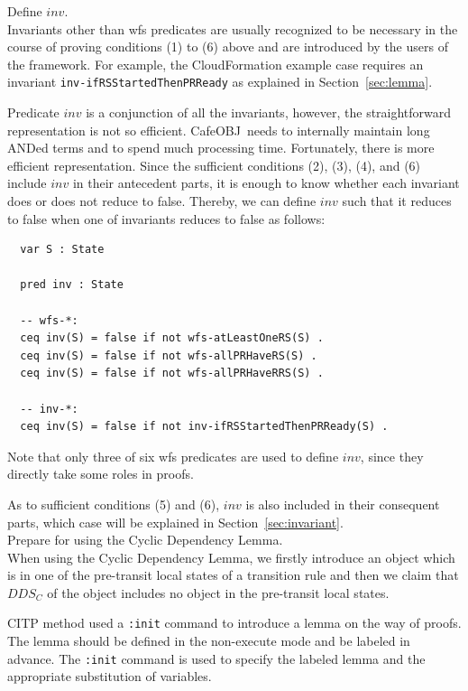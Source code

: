\documentclass[12pt]{report}
\newcommand{\cafeobj}{{\sf CafeOBJ}~}
\begin{document}
 Define $inv$. \\ Invariants other than wfs
predicates are usually recognized to be necessary in the course of
proving conditions (1) to (6) above and are introduced by the users of
the framework. For example, the CloudFormation example case requires
an invariant {\tt inv-ifRSStartedThenPRReady} as explained in
Section~\ref{sec:lemma}.

Predicate $inv$ is a conjunction of all the invariants, however, the
straightforward representation is not so efficient. \cafeobj needs to
internally maintain long ANDed terms and to spend much processing
time. Fortunately, there is more efficient representation. Since the sufficient
conditions (2), (3), (4), and (6) include $inv$ in their antecedent
parts, it is enough to know whether each invariant does or does not
reduce to false. Thereby, we can define $inv$ such that it reduces to
false when one of invariants reduces to false as follows:
\small
\begin{verbatim}
  var S : State

  pred inv : State

  -- wfs-*:
  ceq inv(S) = false if not wfs-atLeastOneRS(S) .
  ceq inv(S) = false if not wfs-allPRHaveRS(S) .
  ceq inv(S) = false if not wfs-allPRHaveRRS(S) .

  -- inv-*:
  ceq inv(S) = false if not inv-ifRSStartedThenPRReady(S) .
\end{verbatim}
\normalsize
Note that only three of six wfs predicates are used to define $inv$,
since they directly take some roles in proofs.

As to sufficient conditions (5) and (6), $inv$ is also included in
their consequent parts, which case will be explained in
Section~\ref{sec:invariant}.\\

 Prepare for using the Cyclic Dependency
Lemma. \\ When using the Cyclic Dependency Lemma, we firstly introduce
an object which is in one of the pre-transit local states of a
transition rule and then we claim that $DDS\!_C$ of the object includes
no object in the pre-transit local states.

CITP method used a {\tt :init} command to introduce a lemma on the way
of proofs.  The lemma should be defined in the non-execute mode and be
labeled in advance. The {\tt :init} command is used to specify the labeled lemma and
the appropriate substitution of variables.
\end{document}
